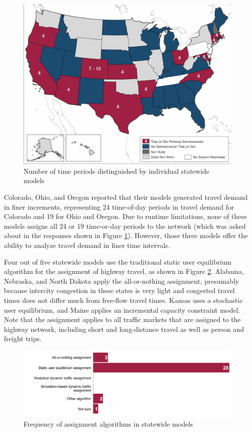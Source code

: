 \begin{figure}[!bt]   %
\centering
\includegraphics[width=6.5in]{graphics/12-time-periods-represented}
\caption{Number of time periods distinguished by individual statewide models}
\label{fig:time-periods-represented}
\end{figure}

Colorado, Ohio, and Oregon reported that their models generated travel demand in finer increments, representing 24 time-of-day periods in travel demand for Colorado and 19 for Ohio and Oregon. Due to runtime limitations, none of these models assigns all 24 or 19 time-or-day periods to the network (which was asked about in the responses shown in Figure \ref{fig:time-periods-represented}). However, those three models offer the ability to analyze travel demand in finer time intervals.

Four out of five statewide models use the traditional static user equilibrium algorithm for the assignment of highway travel, as shown in Figure \ref{fig:assignment-algorithms}. Alabama, Nebraska, and North Dakota apply the all-or-nothing assignment, presumably because intercity congestion in these states is very light and congested travel times does not differ much from free-flow travel times. Kansas uses a stochastic user equilibrium, and Maine applies an incremental capacity constraint model. Note that the assignment applies to all traffic markets that are assigned to the highway network, including short and long-distance travel as well as person and freight trips.

\begin{figure}   %
\centering
\includegraphics[width=6.4in]{graphics/13-assignment-algorithm}
\caption{Frequency of assignment algorithms in statewide models}
\label{fig:assignment-algorithms}
\end{figure}

